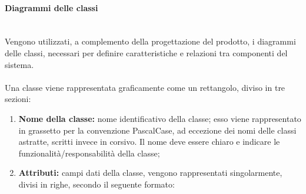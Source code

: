 \documentclass[8pt]{article}
\newcommand{\subsubsubsection}[1]{\paragraph{#1}\mbox{}\\}
\begin{document}
\subsubsubsection{Diagrammi delle classi}
Vengono utilizzati, a complemento della progettazione del prodotto, i diagrammi delle classi, necessari per definire caratteristiche e relazioni tra componenti del sistema.\\\\ 
Una classe viene rappresentata graficamente come un rettangolo, diviso in tre sezioni:
\begin{enumerate}
    \item \textbf{Nome della classe:} nome identificativo della classe; esso viene rappresentato in grassetto per la convenzione PascalCase, ad eccezione dei nomi delle classi astratte, scritti invece in corsivo. Il nome deve essere chiaro e indicare le funzionalità/responsabilità della classe;
    \item \textbf{Attributi:} campi dati della classe, vengono rappresentati singolarmente, divisi in righe, secondo il seguente formato:
    \begin{center}
    

\end{center}
\end{enumerate}
\end{document}
